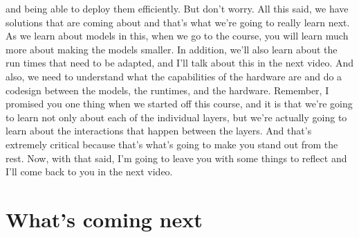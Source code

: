 and being able to deploy them efficiently.
But don't worry.
All this said, we have solutions that are coming about
and that's what we're going to really learn next.
As we learn about models in this, when we go to the course,
you will learn much more about making the models smaller.
In addition, we'll also learn about the run times that need to be adapted,
and I'll talk about this in the next video.
And also, we need to understand what the capabilities of the hardware
are and do a codesign between the models, the runtimes, and the hardware.
Remember, I promised you one thing when we started off this course,
and it is that we're going to learn not only about each
of the individual layers, but we're actually
going to learn about the interactions that happen between the layers.
And that's extremely critical because that's
what's going to make you stand out from the rest.
Now, with that said, I'm going to leave you with some things to reflect
and I'll come back to you in the next video.

\section{What's coming next}

